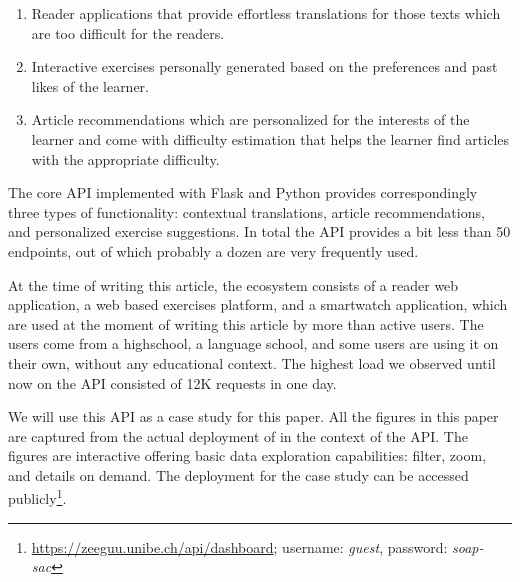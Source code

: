 \documentclass[conference]{IEEEtran}
\begin{document}
  \begin{enumerate}

    \item Reader applications that provide effortless translations for those texts which are too difficult for the readers.

    \item Interactive exercises personally generated based on the preferences and past likes of the learner.

    \item Article recommendations which are personalized for the interests of the learner and come with difficulty estimation that helps the learner find articles with the appropriate difficulty.

  \end{enumerate}

  The core API implemented with Flask and Python provides correspondingly three types of functionality: contextual translations, article recommendations, and personalized exercise suggestions. In total the API provides a bit less than 50 endpoints, out of which probably a dozen are very frequently used. 

  At the time of writing this article, the ecosystem consists of a reader web application, a web based exercises platform, and a smartwatch application, which are used at the moment of writing this article by more than \activeUserCount active users. The users come from a highschool, a language school, and some users are using it on their own, without any educational context. The highest load we observed until now on the API consisted of 12K requests in one day.
  
  We will use this \zee API as a case study for this paper. 
  All the figures in this paper are captured from the actual deployment of \tool in the context of the \zee API. The figures are interactive offering basic data exploration capabilities: filter, zoom, and details on demand\cite{Shne99a}. The \tool deployment for the case study can be accessed publicly\footnote{\url{https://zeeguu.unibe.ch/api/dashboard}; username: {\em guest}, password: {\em soap-sac}}. 

\end{document}
